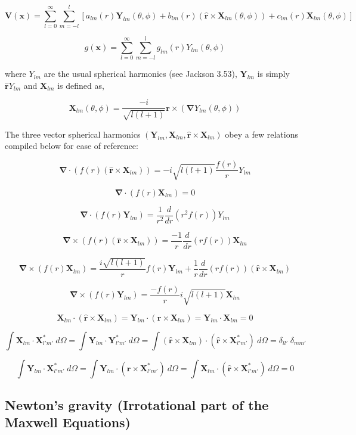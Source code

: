 \documentclass {article}
\renewcommand\vec{\mathbf}
\let\OldS\nabla
\renewcommand{\nabla}{\boldsymbol{\OldS}}
\let\OldHat\hat
\renewcommand{\hat}[1]{\OldHat{\mathbf{#1}}}
\begin{document}
$$\vec V (\vec x) = \sum_{l=0}^{\infty} \sum_{m=-l}^{l} \left[a_{lm}(r) \vec Y_{lm}(\theta, \phi) +b_{lm}(r) \left( \hat r \times \vec X_{lm} (\theta, \phi) \right) +c_{lm}(r) \vec X_{lm} (\theta, \phi) \right] $$

$$g(\vec x) = \sum_{l=0}^{\infty} \sum_{m=-l}^{l} g_{lm}(r) Y_{lm}(\theta, \phi)$$

where $Y_{lm}$ are the usual spherical harmonics (see Jackson 3.53), $\vec Y_{lm}$ is simply $\hat r Y_{lm}$  and $\vec X_{lm}$ is defined as,

$$\vec X_{lm}(\theta, \phi) = \frac {-i}{\sqrt{l(l+1)}} \vec r \times \left( \nabla Y_{lm}(\theta, \phi) \right) $$

The three vector spherical harmonics $(\vec Y_{lm}, \vec X_{lm}, \hat r \times \vec X_{lm} )$ obey a few relations compiled below for ease of reference:

$$\nabla  \cdot \left( f(r) \left( \hat r \times \vec X_{lm} \right) \right) = - i \sqrt {l(l+1)} \frac {f(r)} {r} Y_{lm}$$

$$\nabla \cdot \left( f(r) \vec X_{lm} \right) = 0 $$

$$ \nabla \cdot \left( f(r) \vec Y_{lm} \right) = \frac {1}{r^2} \frac d {dr} \left(r^2 f(r) \right) Y_{lm}$$

$$\nabla \times \left( f(r) \left( \hat r \times \vec X_{lm} \right) \right) = \frac {-1} {r} \frac d {dr} \left( r f(r) \right) \vec X_{lm}$$

$$\nabla \times \left( f(r) \vec X_{lm} \right) = \frac {i \sqrt{l(l+1)} } {r} f(r) \vec Y_{lm} + \frac 1 r \frac d {dr} \left( r f(r) \right) \left( \hat r \times \vec X_{lm} \right)$$

$$\nabla \times \left( f(r) \vec Y_{lm} \right) = \frac {- f(r)} r i \sqrt {l (l+1)} \vec X_{lm}$$

$$ \vec X_{lm} \cdot ( \hat r \times \vec X_{lm}) = \vec Y_{lm} \cdot  ( \hat r \times \vec X_{lm}) = \vec Y_{lm} \cdot \vec X_{lm} = 0$$ 

$$ \int \vec X_{lm} \cdot \vec X_{l' m'}^* ~ d \Omega  = \int \vec Y_{lm} \cdot \vec Y_{l' m'}^* ~ d \Omega  = \int ( \hat r \times \vec X_{lm}) \cdot ( \hat r \times \vec X_{l' m'}^*) ~ d \Omega  = \delta_{ll'} ~ \delta_{m m'} $$

$$\int \vec Y_{lm} \cdot \vec X_{l' m'}^* ~ d \Omega = \int \vec Y_{lm} \cdot ( \hat r \times \vec X_{l' m'}^* ) ~ d \Omega  =  \int \vec X_{lm} \cdot ( \hat r \times \vec X_{l' m'}^* ) ~ d \Omega   = 0 $$

\newpage
\subsection{Newton's gravity (Irrotational part of the Maxwell Equations)}
\end{document}
